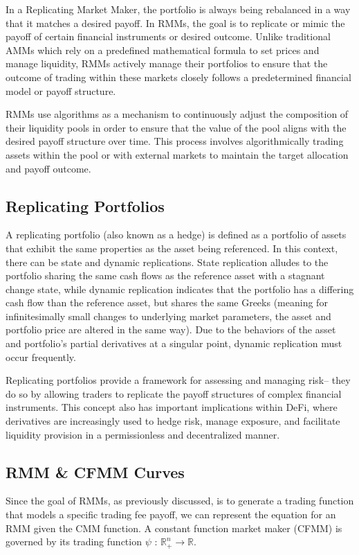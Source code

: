 \documentclass[12pt]{article}
\begin{document}
In a Replicating Market Maker, the portfolio is always being rebalanced in a way that it matches a desired payoff. In RMMs, the goal is to replicate or mimic the payoff of certain financial instruments or desired outcome. Unlike traditional AMMs which rely on a predefined mathematical formula to set prices and manage liquidity, RMMs actively manage their portfolios to ensure that the outcome of trading within these markets closely follows a predetermined financial model or payoff structure.

RMMs use algorithms as a mechanism to continuously adjust the composition of their liquidity pools in order to ensure that the value of the pool aligns with the desired payoff structure over time. This process involves algorithmically trading assets within the pool or with external markets to maintain the target allocation and payoff outcome.

\subsection{Replicating Portfolios}

A replicating portfolio (also known as a hedge) is defined as a portfolio of assets that exhibit the same properties as the asset being referenced. In this context, there can be state and dynamic replications. State replication alludes to the portfolio sharing the same cash flows as the reference asset with a stagnant change state, while dynamic replication indicates that the portfolio has a differing cash flow than the reference asset,  but shares the same Greeks (meaning for infinitesimally small changes to underlying market parameters, the asset and portfolio price are altered in the same way). Due to the behaviors of the asset and portfolio’s partial derivatives at a singular point, dynamic replication must occur frequently. 

Replicating portfolios provide a framework for assessing and managing risk-- they do so by allowing traders to replicate the payoff structures of complex financial instruments. This concept also has important implications within DeFi, where derivatives are increasingly used to hedge risk, manage exposure, and facilitate liquidity provision in a permissionless and decentralized manner. 
\subsection{RMM \& CFMM Curves}
Since the goal of RMMs, as previously discussed, is to generate a trading function that models a specific trading fee payoff, we can represent the equation for an RMM given the CMM function. A constant function market maker (CFMM) is governed by its trading function \(\psi \) : \(\mathbb{R}^n_+ \to \mathbb{R}\).
\end{document}
